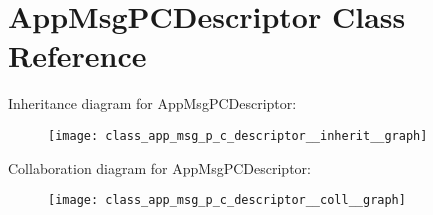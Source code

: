\hypertarget{class_app_msg_p_c_descriptor}{}\section{App\+Msg\+P\+C\+Descriptor Class Reference}
\label{class_app_msg_p_c_descriptor}


Inheritance diagram for App\+Msg\+P\+C\+Descriptor\+:\nopagebreak
\begin{figure}[H]
\begin{center}
\leavevmode
\texttt{[image: class\_app\_msg\_p\_c\_descriptor\_\_inherit\_\_graph]}
\end{center}
\end{figure}


Collaboration diagram for App\+Msg\+P\+C\+Descriptor\+:\nopagebreak
\begin{figure}[H]
\begin{center}
\leavevmode
\texttt{[image: class\_app\_msg\_p\_c\_descriptor\_\_coll\_\_graph]}
\end{center}
\end{figure}
